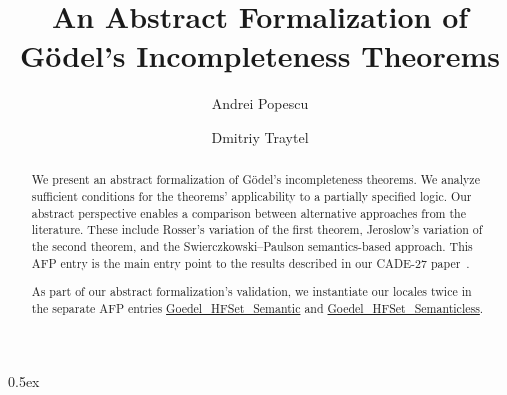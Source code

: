 \documentclass[10pt,a4paper]{report}
\begin{document}
\title{An Abstract Formalization of G\"odel's Incompleteness Theorems}
\author{Andrei Popescu \and Dmitriy Traytel}

\maketitle

\begin{abstract} We present an abstract formalization of G\"odel's incompleteness theorems.
We analyze sufficient conditions for the theorems' applicability to a partially specified logic.
Our abstract perspective enables a comparison between alternative approaches from the literature.
These include Rosser's variation of the first theorem, Jeroslow's variation of the second theorem,
and the Swierczkowski--Paulson semantics-based approach. This AFP entry is the main entry point to the results
described in our CADE-27 paper~\cite{DBLP:conf/cade/0001T19}.

As part of our abstract formalization's validation, we instantiate our locales twice in the separate
AFP entries \href{https://www.isa-afp.org/entries/Goedel_HFSet_Semantic.html}{Goedel\_HFSet\_Semantic} and
\href{https://www.isa-afp.org/entries/Goedel_HFSet_Semanticless.html}{Goedel\_HFSet\_Semanticless}.
\end{abstract}

\tableofcontents

\parindent 0pt\parskip 0.5ex





\end{document}
